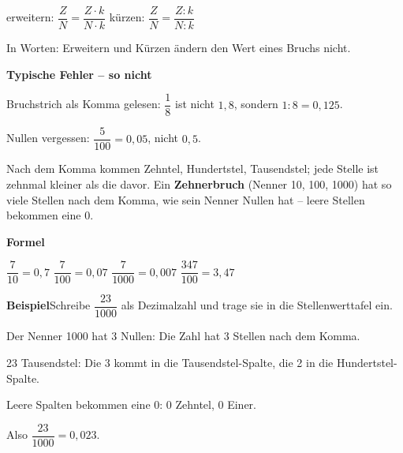 \documentclass[11pt]{article}
\newcommand{\nr}[1]{\makebox[7mm][l]{\textbf{#1}}}
\begin{document}
\begin{tcolorbox}[colback=mbkasten,colframe=mbgrau,boxrule=0.5pt,arc=1mm,left=3mm,right=3mm,top=2mm,bottom=2mm,title={\bfseries Formel auf einen Blick},coltitle=black,colbacktitle=black!10]
{\Large erweitern: $\dfrac{Z}{N} = \dfrac{Z \cdot k}{N \cdot k}$ \qquad kürzen: $\dfrac{Z}{N} = \dfrac{Z : k}{N : k}$}\par\medskip
In Worten: Erweitern und Kürzen ändern den Wert eines Bruchs nicht.\par\medskip
\end{tcolorbox}
\medskip\noindent\textbf{Typische Fehler – so nicht}\par\smallskip
\noindent\nr{$\times$}Bruchstrich als Komma gelesen: $\dfrac{1}{8}$ ist nicht $1{,}8$, sondern $1 : 8 = 0{,}125$.\par
\noindent\nr{$\times$}Nullen vergessen: $\dfrac{5}{100} = 0{,}05$, nicht $0{,}5$.\par
\clearpage\label{s:A}\noindent\colorbox{black!12}{}\hspace{3mm}{\Large\bfseries Zehntel, Hundertstel, Tausendstel}\par\smallskip
\noindent Nach dem Komma kommen Zehntel, Hundertstel, Tausendstel; jede Stelle ist zehnmal kleiner als die davor. Ein \textbf{Zehnerbruch} (Nenner 10, 100, 1000) hat so viele Stellen nach dem Komma, wie sein Nenner Nullen hat – leere Stellen bekommen eine 0.\par\medskip
\noindent\textbf{Formel}\par\nopagebreak\noindent\hspace*{4mm}\begin{minipage}{\dimexpr\linewidth-4mm\relax}$\dfrac{7}{10} = 0{,}7$ \qquad $\dfrac{7}{100} = 0{,}07$ \qquad $\dfrac{7}{1000} = 0{,}007$ \qquad $\dfrac{347}{100} = 3{,}47$\end{minipage}\par\medskip
\noindent\textbf{Beispiel}\quad Schreibe $\dfrac{23}{1000}$ als Dezimalzahl und trage sie in die Stellenwerttafel ein.\par\smallskip
\noindent\begin{minipage}[t]{0.6\linewidth}\vspace{0pt}\par\noindent{}Der Nenner 1000 hat 3 Nullen: Die Zahl hat 3 Stellen nach dem Komma.\par\smallskip\par\noindent{}23 Tausendstel: Die 3 kommt in die Tausendstel-Spalte, die 2 in die Hundertstel-Spalte.\par\smallskip\par\noindent{}Leere Spalten bekommen eine 0: 0 Zehntel, 0 Einer.\par\smallskip\par\noindent{}Also $\dfrac{23}{1000} = 0{,}023$.\par\smallskip\end{minipage}\hfill
\end{document}
